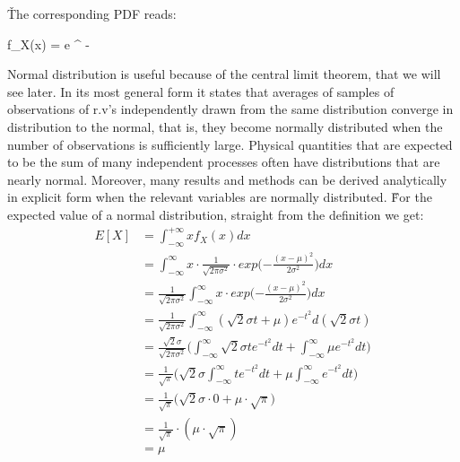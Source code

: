 \v
The corresponding PDF reads:

\bse
f_{X}(x) =  e ^ {-}
\ese
\ed


Normal distribution is useful because of the central limit theorem, that we will see later. In its most general form
it states that averages of samples of observations of r.v's independently drawn from the same distribution converge
in distribution to the normal, that is, they become normally distributed when the number of observations is
sufficiently large. Physical quantities that are expected to be the sum of many independent processes often have
distributions that are nearly normal. Moreover, many results and methods can be derived analytically in explicit form
when the relevant variables are normally distributed. \v

For the expected value of a normal distribution, straight from the
definition we get:
{\setlength{\jot}{11pt}
\begin{align*}
E[X] &= \int_{-\infty}^{+\infty} x f_{X}(x) dx \\
&= \int_{-\infty}^\infty x \cdot \frac{1}{\sqrt{2\pi\sigma^2}}
\cdot exp \Big( {-\frac{(x - \mu)^2}{2\sigma^2}}\Big) dx \\
&= \frac{1}{\sqrt{2\pi\sigma^2}} \int_{-\infty}^\infty x \cdot exp \Big({-\frac{(x - \mu)^2}{2\sigma^2}} \Big) dx\\
&= \frac{1}{\sqrt{2\pi\sigma^2}} \int_{-\infty}^\infty (\sqrt{2} \sigma t + \mu) e^{-t^2} d (\sqrt{2} \sigma t) \\
&= \frac{\sqrt{2} \sigma}{\sqrt{2\pi\sigma^2}} \Big(\int_{-\infty}^\infty \sqrt{2} \sigma t e ^ {-t^2} dt
+ \int_{-\infty}^\infty \mu e ^ {-t^2} dt \Big) \\
&= \frac{1}{\sqrt{\pi}} \Big( \sqrt{2} \sigma \int_{-\infty}^\infty t e^ {-t^2} dt
+ \mu \int_{-\infty}^\infty e ^ {-t^2} dt \Big) \\
&= \frac{1}{\sqrt{\pi}} \Big( \sqrt{2} \sigma \cdot 0 + \mu \cdot \sqrt{\pi} \Big)\\
&= \frac{1}{\sqrt{\pi}} \cdot (\mu \cdot \sqrt{\pi})\\
&= \mu
\end{align*}}

